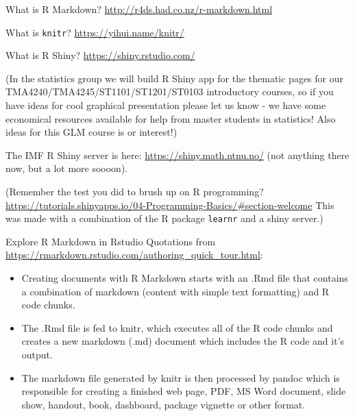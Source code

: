 \documentclass[
  ignorenonframetext,
]{beamer}
\providecommand{\tightlist}{%
  \setlength{\itemsep}{0pt}\setlength{\parskip}{0pt}}
\begin{document}
\begin{frame}[fragile]
\begin{block}{What is R Markdown?}
\protect\hypertarget{what-is-r-markdown}{}
\url{http://r4ds.had.co.nz/r-markdown.html}
\end{block}

\begin{block}{What is \texttt{knitr}?}
\protect\hypertarget{what-is-knitr}{}
\url{https://yihui.name/knitr/}
\end{block}

\begin{block}{What is R Shiny?}
\protect\hypertarget{what-is-r-shiny}{}
\url{https://shiny.rstudio.com/}

(In the statistics group we will build R Shiny app for the thematic
pages for our TMA4240/TMA4245/ST1101/ST1201/ST0103 introductory courses,
so if you have ideas for cool graphical presentation please let us know
- we have some economical resources available for help from master
students in statistics! Also ideas for this GLM course is or interest!)

The IMF R Shiny server is here: \url{https://shiny.math.ntnu.no/} (not
anything there now, but a lot more soooon).

(Remember the test you did to brush up on R programming?
\url{https://tutorials.shinyapps.io/04-Programming-Basics/\#section-welcome}
This was made with a combination of the R package \texttt{learnr} and a
shiny server.)
\end{block}
\end{frame}

\begin{frame}
\begin{block}{Explore R Markdown in Rstudio}
\protect\hypertarget{explore-r-markdown-in-rstudio}{}
Quotations from
\url{https://rmarkdown.rstudio.com/authoring_quick_tour.html}:

\begin{itemize}
\tightlist
\item
  Creating documents with R Markdown starts with an .Rmd file that
  contains a combination of markdown (content with simple text
  formatting) and R code chunks.
\item
  The .Rmd file is fed to knitr, which executes all of the R code chunks
  and creates a new markdown (.md) document which includes the R code
  and it's output.
\item
  The markdown file generated by knitr is then processed by pandoc which
  is responsible for creating a finished web page, PDF, MS Word
  document, slide show, handout, book, dashboard, package vignette or
  other format.
\end{itemize}
\end{block}
\end{frame}
\end{document}
